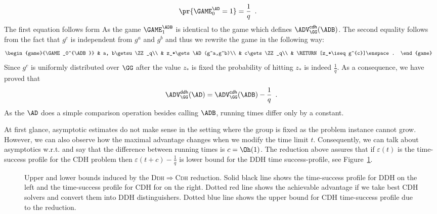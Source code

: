 \documentclass{crypto-exercise}
\begin{document}
\begin{solution}
\begin{align*}
    \pr{\GAME_0^\AD=1}&=\frac{1}{q}\enspace.
  \end{align*}
  The first equation follows form As the game $\GAME_1^\ADB$ is
  identical to the game which defines $\ADVCDH{\GG}{\ADB}$. The second
  equality follows from the fact that $g^c$ is independent from $g^a$
  and $g^b$ and thus we rewrite the game in the following way:
  \begin{align*}
    &\begin{game}{\GAME_0^{\ADB}}
      & a, b\getsu \ZZ_q\\
      & z_*\gets \AD(g^a,g^b)\\
      & c\gets \ZZ_q\\ 
      & \RETURN [z_*\iseq g^{c}]\enspace.
    \end{game}
  \end{align*}
  Since $g^c$ is uniformly distributed over $\GG$ after the value
  $z_*$ is fixed the probability of hitting $z_*$ is indeed
  $\frac{1}{q}$. As a consequence, we have proved that 
  \begin{align*}
    \ADVDDH{\GG}{\AD} = \ADVCDH{\GG}{\ADB}-\frac{1}{q}\enspace.
  \end{align*}
  As the $\AD$ does a simple comparison operation besides calling
  $\ADB$, running times differ only by a constant. 

  \begin{remark}
    At first glance, asymptotic estimates do not make sense in the
    setting where the group is fixed as the problem instance cannot
    grow. However, we can also observe how the maximal advantage
    changes when we modify the time limit $t$. Consequently, we can
    talk about asymptotics w.r.t. and say that the difference between
    running times is $c=\Oh(1)$. The reduction above assures that if
    $\varepsilon(t)$ is the time-success profile for the CDH problem
    then $\varepsilon(t+c)-\frac{1}{q}$ is lower bound for the DDH
    time success-profile, see
    Figure~\ref{fig:0107-time-success-profiles}.
    \begin{figure}[t]
      \caption{Upper and lower bounds induced by the
        \textsc{Ddh}$\Rightarrow$\textsc{Cdh} reduction. Solid black
        line shows the time-success profile for DDH on the left and
        the time-success profile for CDH for on the right. Dotted red
        line shows the achievable advantage if we take best CDH
        solvers and convert them into DDH distinguishers. Dotted blue
        line shows the upper bound for CDH time-success profile due to
        the reduction.}
      \label{fig:0107-time-success-profiles}
    \end{figure}
  \end{remark}


\end{solution}
\end{document}
